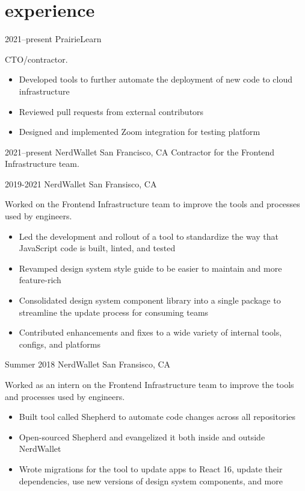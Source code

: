 \documentclass[nofooter]{resume}
\begin{document}

\section{experience}

\begin{entrylist}

\entry
{2021--present}
{PrairieLearn}
{}
{CTO/contractor.
\noindent\begin{itemize}[leftmargin=0.45cm]
\item Developed tools to further automate the deployment of new code to cloud infrastructure
\item Reviewed pull requests from external contributors
\item Designed and implemented Zoom integration for testing platform
\end{itemize}}


\entry
{2021--present}
{NerdWallet}
{San Francisco, CA}
{Contractor for the Frontend Infrastructure team.}


\entry
{2019-2021}
{NerdWallet}
{San Fransisco, CA}
{Worked on the Frontend Infrastructure team to improve the tools and processes used by engineers.
\noindent\begin{itemize}[leftmargin=0.45cm]
\item Led the development and rollout of a tool to standardize the way that JavaScript code is built, linted, and tested
\item Revamped design system style guide to be easier to maintain and more feature-rich
\item Consolidated design system component library into a single package to streamline the update process for consuming teams
\item Contributed enhancements and fixes to a wide variety of internal tools, configs, and platforms
\end{itemize}}


\entry
{Summer 2018}
{NerdWallet}
{San Fransisco, CA}
{Worked as an intern on the Frontend Infrastructure team to improve the tools and processes used by engineers.
\noindent\begin{itemize}[leftmargin=0.45cm]
\item Built tool called Shepherd to automate code changes across all repositories
\item Open-sourced Shepherd and evangelized it both inside and outside NerdWallet
\item Wrote migrations for the tool to update apps to React 16, update their dependencies, use new versions of design system components, and more
\end{itemize}}


\end{entrylist}
\end{document}
